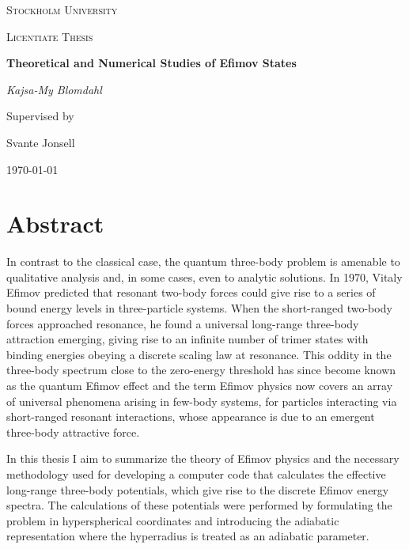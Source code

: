 \documentclass[a4paper,11pt]{book}
\begin{document}
 
\frontmatter

\begin{titlepage}
	\centering
	{\scshape\LARGE Stockholm University \par}
	\vspace{1cm}
	{\scshape\Large Licentiate Thesis\par}
	\vspace{1.5cm}
	{\huge\bfseries Theoretical and Numerical Studies of Efimov States\par}
	\vspace{2cm}
	{\Large\itshape Kajsa-My Blomdahl\par}
	\vfill
	Supervised by\par
	Svante Jonsell 
	
	\vfill
	
	{\large \today\par}
\end{titlepage}

\chapter*{Abstract}
In contrast to the classical case, the quantum three-body problem is amenable to qualitative analysis and, in some cases, even to analytic solutions. In 1970, Vitaly Efimov predicted that resonant two-body forces could give rise to a series of bound energy levels in three-particle systems. When the short-ranged two-body forces approached resonance, he found a universal long-range three-body attraction emerging, giving rise to an infinite number of trimer states with binding energies obeying a discrete scaling law at resonance. This oddity in the three-body spectrum close to the zero-energy threshold has since become known as the quantum Efimov effect and the term Efimov physics now covers an array of universal phenomena arising in few-body systems, for particles interacting via short-ranged resonant interactions, whose appearance is due to an emergent three-body attractive force. 

In this thesis I aim to summarize the theory of Efimov physics and the necessary methodology used for developing a computer code that calculates the effective long-range three-body potentials, which give rise to the discrete Efimov energy spectra. The calculations of these potentials were performed by formulating the problem in hyperspherical coordinates and introducing the adiabatic representation where the hyperradius is treated as an adiabatic parameter. 
\end{document}
